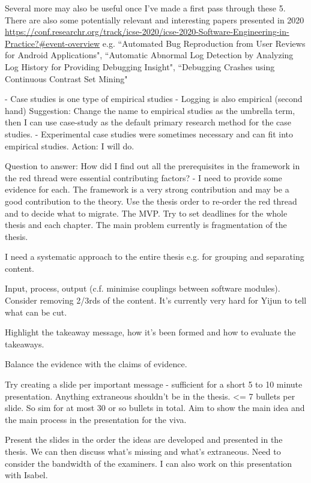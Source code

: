 Several more may also be useful once I've made a first pass through these 5. There are also some potentially relevant and interesting papers presented in 2020 \url{https://conf.researchr.org/track/icse-2020/icse-2020-Software-Engineering-in-Practice?#event-overview} e.g. ``Automated Bug Reproduction from User Reviews for Android Applications", ``Automatic Abnormal Log Detection by Analyzing Log History for Providing Debugging Insight", ``Debugging Crashes using Continuous Contrast Set Mining"

- Case studies is one type of empirical studies
- Logging is also empirical (second hand) 
Suggestion: Change the name to empirical studies as the umbrella term, then I can use case-study as the default primary research method for the case studies.
- Experimental case studies were sometimes necessary and can fit into empirical studies. 
Action: I will do.

Question to answer: How did I find out all the prerequisites in the framework in the red thread were essential contributing factors? - I need to provide some evidence for each.
The framework is a very strong contribution and may be a good contribution to the theory. 
Use the thesis order to re-order the red thread and to decide what to migrate. The MVP. Try to set deadlines for the whole thesis and each chapter. The main problem currently is fragmentation of the thesis.

I need a systematic approach to the entire thesis e.g. for grouping and separating content. 

Input, process, output (c.f. minimise couplings between software modules).
Consider removing 2/3rds of the content. It's currently very hard for Yijun to tell what can be cut.

Highlight the takeaway message, how it's been formed and how to evaluate the takeaways.

Balance the evidence with the claims of evidence.

Try creating a slide per important message - sufficient for a short 5 to 10 minute presentation. Anything extraneous shouldn't be in the thesis. <= 7 bullets per slide. So sim for at most 30 or so bullets in total. Aim to show the main idea and the main process in the presentation for the viva.

Present the slides in the order the ideas are developed and presented in the thesis. We can then discuss what's missing and what's extraneous. Need to consider the bandwidth of the examiners. I can also work on this presentation with Isabel. 

